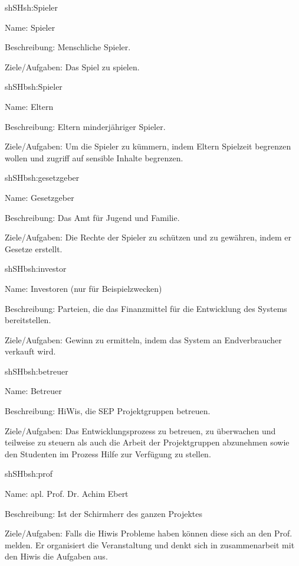 \begin{description}[leftmargin=5em, style=sameline]
	
	\begin{lhp}{sh}{SH}{sh:Spieler}
		\item [Name:] Spieler
		\item [Beschreibung:] Menschliche Spieler.
		\item [Ziele/Aufgaben:] Das Spiel zu spielen.
	\end{lhp}
	
	\begin{lhp}{sh}{SH}{bsh:Spieler}
		\item [Name:] Eltern
		\item [Beschreibung:] Eltern minderjähriger Spieler.
		\item [Ziele/Aufgaben:] Um die Spieler zu kümmern, indem Eltern Spielzeit begrenzen wollen und zugriff auf sensible Inhalte begrenzen.
	\end{lhp}
	
	\begin{lhp}{sh}{SH}{bsh:gesetzgeber}
		\item [Name:] Gesetzgeber
		\item [Beschreibung:] Das Amt für Jugend und Familie.
		\item [Ziele/Aufgaben:] Die Rechte der Spieler zu schützen und zu gewähren, indem er Gesetze erstellt.
	\end{lhp}
	
	\begin{lhp}{sh}{SH}{bsh:investor}
		\item [Name:] Investoren (nur für Beispielzwecken)
		\item [Beschreibung:] Parteien, die das Finanzmittel für die Entwicklung des Systems bereitstellen.
		\item [Ziele/Aufgaben:] Gewinn zu ermitteln, indem das System an Endverbraucher verkauft wird.
	\end{lhp}
	
	\begin{lhp}{sh}{SH}{bsh:betreuer}
		\item [Name:] Betreuer
		\item [Beschreibung:] HiWis, die SEP Projektgruppen betreuen.
		\item [Ziele/Aufgaben:] Das Entwicklungsprozess zu betreuen, zu überwachen und teilweise zu steuern als auch die Arbeit der Projektgruppen abzunehmen sowie den Studenten im Prozess Hilfe zur Verfügung zu stellen. 
	\end{lhp}
	
	\begin{lhp}{sh}{SH}{bsh:prof}
		\item [Name:] apl. Prof. Dr. Achim Ebert
		\item [Beschreibung:] Ist der Schirmherr des ganzen Projektes 
		\item [Ziele/Aufgaben:]  Falls die Hiwis Probleme haben können diese sich an den Prof. melden. Er organisiert die Veranstaltung und denkt sich in zusammenarbeit mit den Hiwis die Aufgaben aus.
	\end{lhp}
		
\end{description}

